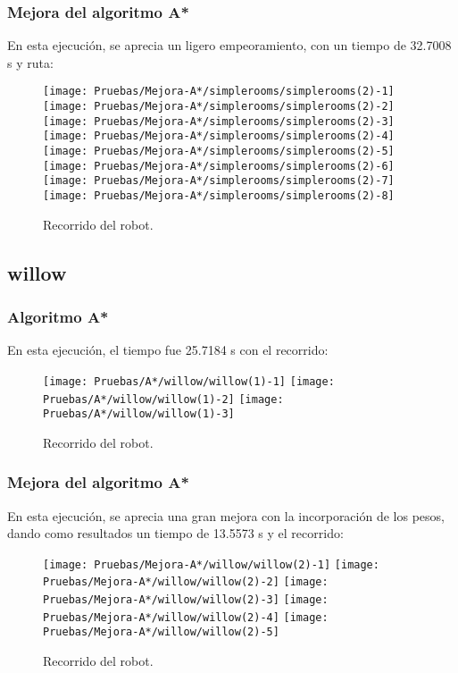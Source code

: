 \documentclass[a4paper, 11pt]{article}
\begin{document}
		\subsubsection{Mejora del algoritmo A*}
			En esta ejecución, se aprecia un ligero empeoramiento, con un tiempo de 32.7008 s y ruta: 

			\begin{figure}[H]
				\centering
				\texttt{[image: Pruebas/Mejora-A*/simplerooms/simplerooms(2)-1]}
				\texttt{[image: Pruebas/Mejora-A*/simplerooms/simplerooms(2)-2]}
				\texttt{[image: Pruebas/Mejora-A*/simplerooms/simplerooms(2)-3]}
				\texttt{[image: Pruebas/Mejora-A*/simplerooms/simplerooms(2)-4]}
				\texttt{[image: Pruebas/Mejora-A*/simplerooms/simplerooms(2)-5]}
				\texttt{[image: Pruebas/Mejora-A*/simplerooms/simplerooms(2)-6]}
				\texttt{[image: Pruebas/Mejora-A*/simplerooms/simplerooms(2)-7]}
				\texttt{[image: Pruebas/Mejora-A*/simplerooms/simplerooms(2)-8]}
				\caption{Recorrido del robot.}
				\label{MA-sim}
			\end{figure}
			
	\subsection{willow}
		\subsubsection{Algoritmo A*}
			En esta ejecución, el tiempo fue 25.7184 s con el recorrido:
			\begin{figure}[H]
				\centering
				\texttt{[image: Pruebas/A*/willow/willow(1)-1]}
				\texttt{[image: Pruebas/A*/willow/willow(1)-2]}
				\texttt{[image: Pruebas/A*/willow/willow(1)-3]}
				\caption{Recorrido del robot.}
				\label{A-wil}
			\end{figure}
			
		\subsubsection{Mejora del algoritmo A*}
			En esta ejecución, se aprecia una gran mejora con la incorporación de los pesos, dando como
			resultados un tiempo de 13.5573 s y el recorrido: 
			
			\begin{figure}[H]
				\centering
				\texttt{[image: Pruebas/Mejora-A*/willow/willow(2)-1]}
				\texttt{[image: Pruebas/Mejora-A*/willow/willow(2)-2]}
				\texttt{[image: Pruebas/Mejora-A*/willow/willow(2)-3]}
				\texttt{[image: Pruebas/Mejora-A*/willow/willow(2)-4]}
				\texttt{[image: Pruebas/Mejora-A*/willow/willow(2)-5]}
				\caption{Recorrido del robot.}
				\label{MA-wil}
			\end{figure}
	
\end{document}
